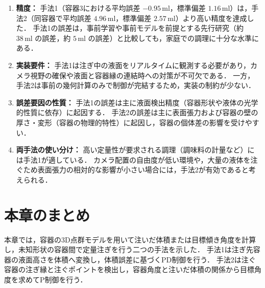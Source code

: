 \begin{enumerate}
  \item \textbf{精度：}  
  手法1（容器3における平均誤差 $-0.95\,\mathrm{ml}$，標準偏差 $1.16\,\mathrm{ml}$）は，手法2（同容器で平均誤差 $4.96\,\mathrm{ml}$，標準偏差 $2.57\,\mathrm{ml}$）より高い精度を達成した．  
  手法1の誤差は，事前学習や事前モデルを前提とする先行研究（約 $38\,\mathrm{ml}$ の誤差\cite{Related1}，約 $5\,\mathrm{ml}$ の誤差\cite{Related2}）と比較しても，家庭での調理に十分な水準にある．  
  \item \textbf{実装要件：}  
  手法1は注ぎ中の液面をリアルタイムに観測する必要があり，カメラ視野の確保や液面と容器縁の連結時への対策が不可欠である．  
  一方，手法2は事前の幾何計算のみで制御が完結するため，実装の制約が少ない．  
  \item \textbf{誤差要因の性質：}  
  手法1の誤差は主に液面検出精度（容器形状や液体の光学的性質に依存）に起因する．  
  手法2の誤差は主に表面張力および容器の壁の厚さ・変形（容器の物理的特性）に起因し，容器の個体差の影響を受けやすい．  
  \item \textbf{両手法の使い分け：}  
  高い定量性が要求される調理（調味料の計量など）には手法1が適している．  
  カメラ配置の自由度が低い環境や，大量の液体を注ぐため表面張力の相対的な影響が小さい場合には，手法2が有効であると考えられる．
\end{enumerate}


\section{本章のまとめ}
\label{sec:pour_summary}

本章では，容器の3D点群モデルを用いて注いだ体積または目標傾き角度を計算し，未知形状の容器間で定量注ぎを行う二つの手法を示した．
手法1は注ぎ先容器の液面高さを体積へ変換し，体積誤差に基づくPD制御を行う．
手法2は注ぐ容器の注ぎ縁と注ぐポイントを検出し，容器角度と注いだ体積の関係から目標角度を求めてP制御を行う．

